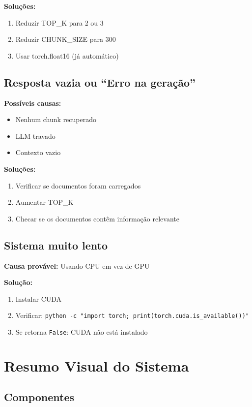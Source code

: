 \documentclass[12pt,a4paper]{article}
\begin{document}
\textbf{Soluções:}
\begin{enumerate}
    \item Reduzir TOP\_K para 2 ou 3
    \item Reduzir CHUNK\_SIZE para 300
    \item Usar torch.float16 (já automático)
\end{enumerate}

\subsection{Resposta vazia ou ``Erro na geração''}

\textbf{Possíveis causas:}
\begin{itemize}
    \item Nenhum chunk recuperado
    \item LLM travado
    \item Contexto vazio
\end{itemize}

\textbf{Soluções:}
\begin{enumerate}
    \item Verificar se documentos foram carregados
    \item Aumentar TOP\_K
    \item Checar se os documentos contêm informação relevante
\end{enumerate}

\subsection{Sistema muito lento}

\textbf{Causa provável:} Usando CPU em vez de GPU

\textbf{Solução:}
\begin{enumerate}
    \item Instalar CUDA
    \item Verificar: \texttt{python -c "import torch; print(torch.cuda.is\_available())"}
    \item Se retorna \texttt{False}: CUDA não está instalado
\end{enumerate}

\section{Resumo Visual do Sistema}

\subsection{Componentes}
\end{document}
